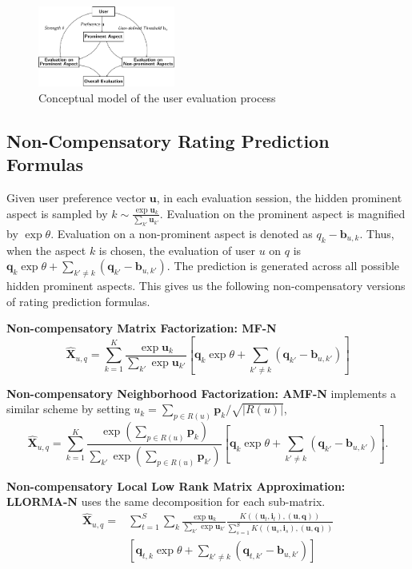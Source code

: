 \documentclass[letterpaper]{article} %
\newcommand{\Rating}{\mathbf{X}}
\begin{document}
 \begin{figure}[htbp]
\begin{center}
\includegraphics[width=0.4\textwidth]{conceptualmodel.pdf}
\caption{Conceptual model of the user evaluation process}
\label{fig:model}
\end{center}
\end{figure}


\subsection{Non-Compensatory Rating Prediction Formulas}
Given user preference vector $\mathbf{u}$, in each evaluation session, the hidden prominent aspect is sampled by $k\sim \frac{\exp \mathbf{u}_k}{\sum_{k'} \mathbf{u}_{k'}} $. Evaluation on the prominent aspect is magnified by  $\exp \theta$. Evaluation on a non-prominent aspect is denoted as $q_k-\mathbf{b}_{u,k}$. Thus, when the aspect $k$ is chosen, the evaluation of user $u$ on $q$ is $\mathbf{q}_k \exp\theta  + \sum_{k'\neq k} (\mathbf{q}_{k'}-\mathbf{b}_{u,k'})$. The prediction is generated across all possible hidden prominent aspects. This gives us the following non-compensatory versions of rating prediction formulas.

\textbf{Non-compensatory Matrix Factorization: MF-N} 
\begin{equation}\label{equ:MF-N}
 \hat{\mathbf{X}}_{u,q}=\sum_{k=1}^{K} \frac{\exp \mathbf{u}_k}{\sum_{k'} \exp \mathbf{u}_{k'}} [ \mathbf{q}_k  \exp\theta  + \sum_{k'\neq k} (\mathbf{q}_{k'}-\mathbf{b}_{u,k'}) ]
\end{equation}


\textbf{Non-compensatory Neighborhood Factorization: AMF-N} implements a similar scheme by setting $u_k =\sum_{p \in R(u)} \mathbf{p}_k/\sqrt{|R(u)|} $, 
\begin{equation}\label{equ:AMF-N}
 \hat{\mathbf{X}}_{u,q}=\sum_{k=1}^{K} \frac{\exp (\sum_{p \in R(u)} \mathbf{p}_k )}{\sum_{k'} \exp  (\sum_{p \in R(u)} \mathbf{p}_{k'} ) } [  \mathbf{q}_k \exp\theta + \sum_{k'\neq k} (\mathbf{q}_{k'}-\mathbf{b}_{u,k'}) ].
\end{equation}

\textbf{Non-compensatory Local Low Rank Matrix Approximation: LLORMA-N} uses the same decomposition for each sub-matrix.  
\begin{eqnarray}\label{equ:LLORMA-N}
\hat{\Rating}_{u,q} = & \sum_{t=1}^{S} \sum_k  \frac{\exp \mathbf{u}_k}{\sum_{k'} \exp \mathbf{u}_{k'}}  \frac{K((\mathbf{u}_t,\mathbf{i}_t),(\mathbf{u},\mathbf{q}))}{\sum_{s=1}^{S} K((\mathbf{u}_s,\mathbf{i}_s),(\mathbf{u},\mathbf{q}))} \\\nonumber
& [ \mathbf{q}_{t,k} \exp\theta  + \sum_{k'\neq k} (\mathbf{q}_{t,k'}-\mathbf{b}_{u,k'}) ]
\end{eqnarray}
\end{document}
